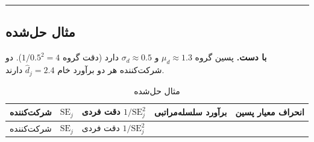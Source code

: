 \begin{center}\rule{0.5\linewidth}{0.5pt}\end{center}

\subsection{مثال حل‌شده}

\textbf{ با دست.} پسین گروه \(\mu_d \approx 1.3\) و
\(\sigma_d \approx 0.5\) دارد (دقت گروه \(1/0.5^2 = 4\)). دو شرکت‌کننده
هر دو برآورد خام \(\hat d_j = 2.4\) دارند.

\begin{longtable}[]{@{}
  >{\raggedright\arraybackslash}p{}
  >{\raggedright\arraybackslash}p{}
  >{\raggedright\arraybackslash}p{}
  >{\raggedright\arraybackslash}p{}
  >{\raggedright\arraybackslash}p{}@{}}
\caption{\centering مثال حل‌شده}\tabularnewline
\toprule\noalign{}
\begin{minipage}[b]{\linewidth}\raggedright
شرکت‌کننده
\end{minipage} & \begin{minipage}[b]{\linewidth}\raggedright
\(\mathrm{SE}_j\)
\end{minipage} & \begin{minipage}[b]{\linewidth}\raggedright
دقت فردی \(1/\mathrm{SE}_j^2\)
\end{minipage} & \begin{minipage}[b]{\linewidth}\raggedright
برآورد سلسله‌مراتبی
\end{minipage} & \begin{minipage}[b]{\linewidth}\raggedright
انحراف معیار پسین
\end{minipage} \\
\midrule\noalign{}
\endfirsthead
\toprule\noalign{}
\begin{minipage}[b]{\linewidth}\raggedright
شرکت‌کننده
\end{minipage} & \begin{minipage}[b]{\linewidth}\raggedright
\(\mathrm{SE}_j\)
\end{minipage} & \begin{minipage}[b]{\linewidth}\raggedright
دقت فردی \(1/\mathrm{SE}_j^2\)
\end{minipage} & \begin{minipage}[b]{\linewidth}\raggedright

\end{minipage}
\end{longtable}
